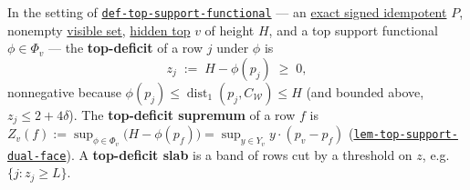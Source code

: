 \hypertarget{def:top-deficit}{}%
\begin{definition}\label{def:top-deficit}
In the setting of \hyperref[def:top-support-functional]{\texttt{def-\allowbreak{}top-\allowbreak{}support-\allowbreak{}functional}} --- an
\hyperref[def:signed-idempotent]{exact signed idempotent} $P$, nonempty \hyperref[def:visible-set]{visible set},
\hyperref[def:height]{hidden top} $v$ of height $H$, and a top support functional $\phi\in\Phi_v$ --- the
\textbf{top-deficit} of a row $j$ under $\phi$ is
\[z_j\;:=\;H-\phi(p_j)\;\ge\;0,\]
nonnegative because $\phi(p_j)\le\operatorname{dist}_1(p_j,C_{\mathcal W})\le H$ (and bounded above,
$z_j\le 2+4\delta$). The \textbf{top-deficit supremum} of a row $f$ is
$Z_v(f):=\sup_{\phi\in\Phi_v}\big(H-\phi(p_f)\big)=\sup_{y\in Y_v}y\cdot(p_v-p_f)$
(\hyperlink{dag:lem-top-support-dual-face}{\texttt{lem-\allowbreak{}top-\allowbreak{}support-\allowbreak{}dual-\allowbreak{}face}}). A \textbf{top-deficit slab} is a band of rows cut by a threshold on $z$,
e.g. $\{j:z_j\ge L\}$.
\end{definition}
